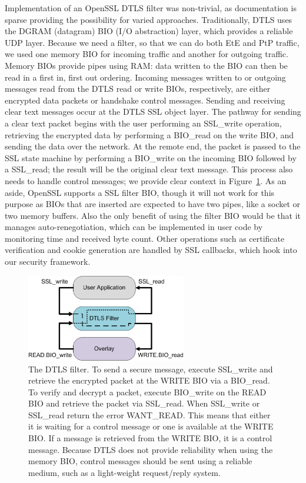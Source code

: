 \documentclass[conference]{IEEEtran}
\begin{document}
Implementation of an OpenSSL DTLS filter was non-trivial, as documentation is
sparse providing the possibility for varied approaches.  Traditionally, DTLS
uses the DGRAM (datagram) BIO (I/O abstraction) layer, which provides a reliable
UDP layer.  Because we need a filter, so that we can do both EtE and PtP traffic,
we used one memory BIO  for incoming traffic and another for outgoing traffic.
Memory BIOs provide pipes using RAM: data written to the BIO can then be read
in a first in, first out ordering.  Incoming messages written to or outgoing
messages read from the DTLS read or write BIOs, respectively, are 
either encrypted data packets or handshake control messages.  Sending and 
receiving clear text messages occur at the DTLS SSL object layer.  The pathway
for sending a clear text packet begins with the user performing an SSL\_write
operation, retrieving the encrypted data by performing a BIO\_read on the write
BIO, and sending the data over the network.  At the remote end, the packet is
passed to the SSL state machine by performing a BIO\_write on the incoming BIO
followed by a SSL\_read; the result will be the original clear text message.
This process also needs to handle control messages; we provide clear context in
Figure~\ref{fig:dtls_filter}.  As an aside, OpenSSL supports a SSL filter
BIO, though it will not work for this purpose as BIOs that are inserted are
expected to have two pipes, like a socket or two memory buffers.  Also the only
benefit of using the filter BIO would be that it manages auto-renegotiation,
which can be implemented in user code by monitoring time and received byte
count.  Other operations such as certificate verification and cookie generation
are handled by SSL callbacks, which hook into our security framework.

\begin{figure}[h]
\centering
\includegraphics[width=2.75in]{dtls_filter.eps}
\caption{The DTLS filter.  To send a secure message, execute SSL\_write and
retrieve the encrypted packet at the WRITE BIO via a BIO\_read.  To verify
and decrypt a packet, execute BIO\_write on the READ BIO and retrieve the
packet via SSL\_read.  When SSL\_write or SSL\_read return the error WANT\_READ.
This means that either it is waiting for a control message or one is available
at the WRITE BIO.  If a message is retrieved from the WRITE BIO, it is a control
message.  Because DTLS does not provide reliability when using the memory BIO,
control messages should be sent using a reliable medium, such as a light-weight
request/reply system.}
\label{fig:dtls_filter}
\end{figure}
\end{document}
